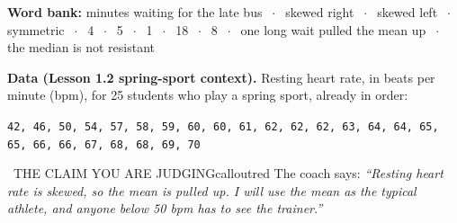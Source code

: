 \begin{wordbankbox}[top=3pt,bottom=3pt]\small\raggedright
\textbf{Word bank:} minutes waiting for the late bus \ensuremath{\;\cdot\;} skewed right \ensuremath{\;\cdot\;} skewed left \ensuremath{\;\cdot\;} symmetric \ensuremath{\;\cdot\;} 4 \ensuremath{\;\cdot\;} 5 \ensuremath{\;\cdot\;} 1 \ensuremath{\;\cdot\;} 18 \ensuremath{\;\cdot\;} 8 \ensuremath{\;\cdot\;} one long wait pulled the mean up \ensuremath{\;\cdot\;} the median is not resistant
\end{wordbankbox}

\draftline
{}
\workspace{1.6in}

\newpage
{}


\textbf{Data (Lesson 1.2 spring-sport context).} Resting heart rate, in beats per minute (bpm), for 25 students who play a spring sport, already in order:

\begin{center}
{\small\texttt{42, 46, 50, 54, 57, 58, 59, 60, 60, 61, 62, 62, 62, 63, 64, 64, 65, 65, 66, 66, 67, 68, 68, 69, 70}}
\end{center}

\begin{callout}{\IconWarn\ THE CLAIM YOU ARE JUDGING}{calloutred}
The coach says: \emph{``Resting heart rate is skewed, so the mean is pulled up. I will use the mean as the typical athlete, and anyone below 50 bpm has to see the trainer.''}
\end{callout}

